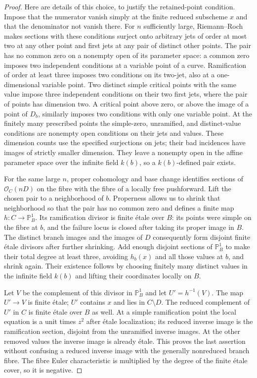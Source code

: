 \begin{proof}
Here are details of this choice, to justify the retained-point
condition. Impose that the numerator vanish simply at the finite
reduced subscheme $x$ and that the denominator not vanish there.
For $n$ sufficiently large, Riemann--Roch makes sections with these
conditions surject onto arbitrary jets of order at most two at any
other point and first jets at any pair of distinct other points.
The pair has no common zero on a nonempty open of its parameter
space: a common zero imposes two independent conditions at a
variable point of a curve. Ramification of order at least three
imposes two conditions on its two-jet, also at a one-dimensional
variable point. Two distinct simple critical points with the same
value impose three independent conditions on their two first jets,
where the pair of points has dimension two. A critical point above
zero, or above the image of a point of $D_b$, similarly imposes
two conditions with only one variable point. At the finitely many
prescribed points the simple-zero, unramified, and distinct-value
conditions are nonempty open conditions on their jets and values.
These dimension counts use the specified surjections on jets;
their bad incidences have images of strictly smaller dimension.
They leave a nonempty open in the affine parameter space over
the infinite field $k(b)$, so a $k(b)$-defined pair exists.

For the same large $n$, proper cohomology and base change identifies
sections of $\mathcal O_C(nD)$ on the fibre with the fibre of a
locally free pushforward. Lift the chosen pair to a neighborhood
of $b$. Properness allows us to shrink that neighborhood so that
the pair has no common zero and defines a finite map
$h:C\to\mathbb P^1_B$. Its ramification divisor is finite \'etale
over $B$: its points were simple on the fibre at $b$, and the
failure locus is closed after taking its proper image in $B$.
The distinct branch images and the images of $D$ consequently
form disjoint finite \'etale divisors after further shrinking.
Add enough disjoint sections of $\mathbb P^1_B$ to make their
total degree at least three, avoiding $h_b(x)$ and all those
values at $b$, and shrink again. Their existence follows by
choosing finitely many distinct values in the infinite field
$k(b)$ and lifting their coordinates locally on $B$.

Let $V$ be the complement of this divisor in $\mathbb P^1_B$
and let $U'=h^{-1}(V)$. The map $U'\to V$ is finite \'etale;
$U'$ contains $x$ and lies in $C\setminus D$. The reduced
complement of $U'$ in $C$ is finite \'etale over $B$ as well.
At a simple ramification point the local equation is a unit
times $z^2$ after \'etale localization; its reduced inverse image
is the ramification section, disjoint from the unramified inverse
images. At the other removed values the inverse image is already
\'etale. This proves the last assertion without confusing a
reduced inverse image with the generally nonreduced branch fibre.
The fibre Euler characteristic is multiplied by the degree of
the finite \'etale cover, so it is negative.


\end{proof}
